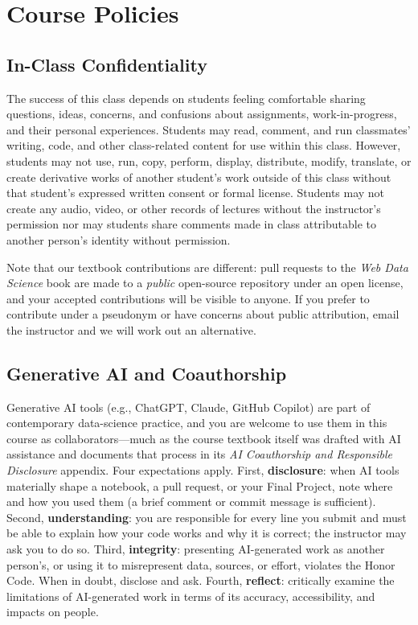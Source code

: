 \documentclass[11pt]{memoir}
\begin{document}
\section{Course Policies}

\subsection{In-Class Confidentiality}
The success of this class depends on students feeling comfortable sharing questions, ideas, concerns, and confusions about assignments, work-in-progress, and their personal experiences. Students may read, comment, and run classmates' writing, code, and other class-related content for use within this class. However, students may not use, run, copy, perform, display, distribute, modify, translate, or create derivative works of another student's work outside of this class without that student's expressed written consent or formal license. Students may not create any audio, video, or other records of lectures without the instructor's permission nor may students share comments made in class attributable to another person's identity without permission.

Note that our textbook contributions are different: pull requests to the \textit{Web Data Science} book are made to a \textit{public} open-source repository under an open license, and your accepted contributions will be visible to anyone. If you prefer to contribute under a pseudonym or have concerns about public attribution, email the instructor and we will work out an alternative.

\subsection{Generative AI and Coauthorship}
Generative AI tools (e.g., ChatGPT, Claude, GitHub Copilot) are part of contemporary data-science practice, and you are welcome to use them in this course as collaborators---much as the course textbook itself was drafted with AI assistance and documents that process in its \textit{AI Coauthorship and Responsible Disclosure} appendix. Four expectations apply. First, \textbf{disclosure}: when AI tools materially shape a notebook, a pull request, or your Final Project, note where and how you used them (a brief comment or commit message is sufficient). Second, \textbf{understanding}: you are responsible for every line you submit and must be able to explain how your code works and why it is correct; the instructor may ask you to do so. Third, \textbf{integrity}: presenting AI-generated work as another person's, or using it to misrepresent data, sources, or effort, violates the Honor Code. When in doubt, disclose and ask. Fourth, \textbf{reflect}: critically examine the limitations of AI-generated work in terms of its accuracy, accessibility, and impacts on people. 
\end{document}
